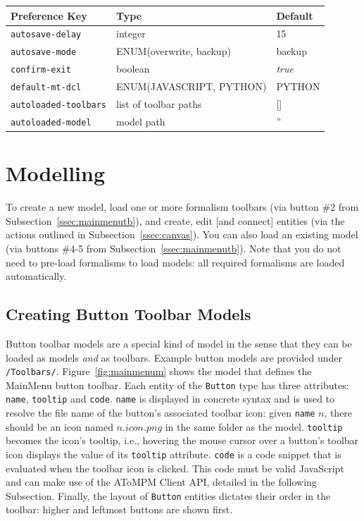 \documentclass{article}
\numberwithin{equation}{section}
\numberwithin{figure}{section}
\begin{document}
\begin{tabular}{| p{4cm}  p{6cm} p{4.56cm} |}
	\hline
	\textbf{Preference Key} 		& \textbf{Type} 			& \textbf{Default} \\ \hline \hline
	\texttt{autosave-delay}			& integer 					& 15\\
	\texttt{autosave-mode}			& ENUM(overwrite, backup) 	& backup \\
	\texttt{confirm-exit}			& boolean 					& \textit{true} \\
	\texttt{default-mt-dcl}			& ENUM(JAVASCRIPT, PYTHON)	& PYTHON \\
	\texttt{autoloaded-toolbars}	& list of toolbar paths		& [] \\
	\texttt{autoloaded-model}		& model path 				& '' \\
	\hline
\end{tabular}





\newpage
\section{Modelling} 
\label{sec:m}
To create a new model, load one or more formalism toolbars (via button \#2 from Subsection~\ref{ssec:mainmenutb}), and create, edit [and connect] entities (via the actions outlined in Subsection~\ref{ssec:canvas}). You can also load an existing model (via buttons \#4-5 from Subsection~\ref{ssec:mainmenutb}). Note that you do not need to pre-load formalisms to load models: all required formalisms are loaded automatically.



\subsection{Creating Button Toolbar Models}
Button toolbar models are a special kind of model in the sense that they can be loaded as models \emph{and} as toolbars. Example button models are provided under \texttt{/Toolbars/}. Figure~\ref{fig:mainmenum} shows the model that defines the MainMenu button toolbar. Each entity of the \texttt{Button} type has three attributes: \texttt{name}, \texttt{tooltip} and \texttt{code}. \texttt{name} is displayed in concrete syntax and is used to resolve the file name of the button's associated toolbar icon: given \texttt{name} $n$, there should be an icon named $n.icon.png$ in the same folder as the model. \texttt{tooltip} becomes the icon's tooltip, i.e., hovering the mouse cursor over a button's toolbar icon displays the value of its \texttt{tooltip} attribute. \texttt{code} is a code snippet that is evaluated when the toolbar icon is clicked. This code must be valid JavaScript and can make use of the AToMPM Client API, detailed in the following Subsection. Finally, the layout of \texttt{Button} entities dictates their order in the toolbar: higher and leftmost buttons are shown first.\\
\end{document}
